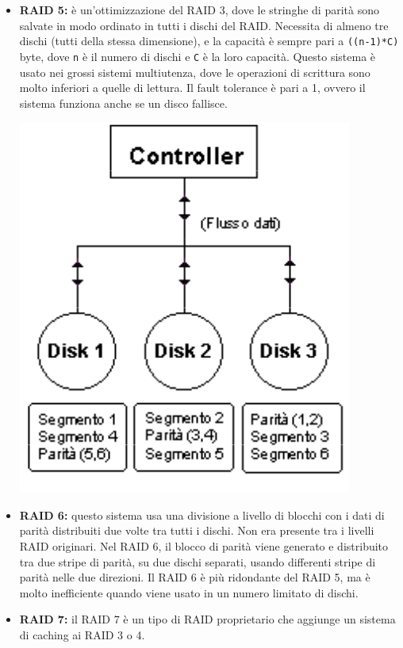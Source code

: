 \documentclass[a4paper]{report}
\begin{document}
\begin{itemize}
\item \textbf{RAID 5:} è un'ottimizzazione del RAID 3, dove le stringhe di parità sono salvate in modo ordinato in tutti i dischi del RAID. Necessita di almeno tre dischi (tutti della stessa dimensione), e la capacità è sempre pari a \texttt{((n-1)*C)} byte, dove \texttt{n} è il numero di dischi e \texttt{C} è la loro capacità. Questo sistema è usato nei grossi sistemi multiutenza, dove le operazioni di scrittura sono molto inferiori a quelle di lettura. Il fault tolerance è pari a 1, ovvero il sistema funziona anche se un disco fallisce. \begin{center}\includegraphics[scale=0.5]{raid5.png}\end{center}

\item \textbf{RAID 6:} questo sistema usa una divisione a livello di blocchi con i dati di parità distribuiti due volte tra tutti i dischi. Non era presente tra i livelli RAID originari. Nel RAID 6, il blocco di parità viene generato e distribuito tra due stripe di parità, su due dischi separati, usando differenti stripe di parità nelle due direzioni. Il RAID 6 è più ridondante del RAID 5, ma è molto inefficiente quando viene usato in un numero limitato di dischi.

\item \textbf{RAID 7:} il RAID 7 è un tipo di RAID proprietario che aggiunge un sistema di caching ai RAID 3 o 4.


\end{itemize}
\end{document}
